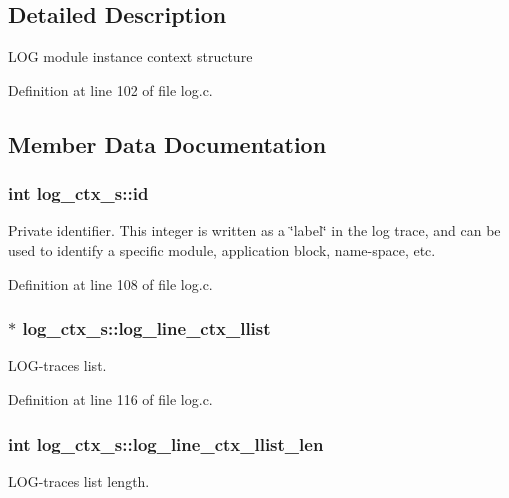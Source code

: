 \subsection{Detailed Description}
L\+OG module instance context structure 

Definition at line 102 of file log.\+c.



\subsection{Member Data Documentation}
\subsubsection[{\texorpdfstring{id}{id}}]{\setlength{\rightskip}{0pt plus 5cm}int log\+\_\+ctx\+\_\+s\+::id}\hypertarget{structlog__ctx__s_a56a669a98c9bf4cf34f233ce1343f956}{}\label{structlog__ctx__s_a56a669a98c9bf4cf34f233ce1343f956}
Private identifier. This integer is written as a \char`\"{}label\char`\"{} in the log trace, and can be used to identify a specific module, application block, name-\/space, etc. 

Definition at line 108 of file log.\+c.

\subsubsection[{\texorpdfstring{log\+\_\+line\+\_\+ctx\+\_\+llist}{log_line_ctx_llist}}]{$\ast$ log\+\_\+ctx\+\_\+s\+::log\+\_\+line\+\_\+ctx\+\_\+llist}\hypertarget{structlog__ctx__s_a388b23d6920493eb0370fde713dd3cd4}{}\label{structlog__ctx__s_a388b23d6920493eb0370fde713dd3cd4}
L\+O\+G-\/traces list. 

Definition at line 116 of file log.\+c.

\subsubsection[{\texorpdfstring{log\+\_\+line\+\_\+ctx\+\_\+llist\+\_\+len}{log_line_ctx_llist_len}}]{\setlength{\rightskip}{0pt plus 5cm}int log\+\_\+ctx\+\_\+s\+::log\+\_\+line\+\_\+ctx\+\_\+llist\+\_\+len}\hypertarget{structlog__ctx__s_a03f1fa736dac6969657399b55a1d1838}{}\label{structlog__ctx__s_a03f1fa736dac6969657399b55a1d1838}
L\+O\+G-\/traces list length. 


